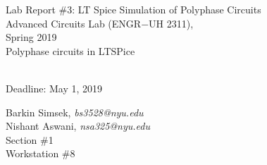 \documentclass[journal]{IEEEtran}
\begin{document}
\begin{titlepage}
    {\centering
        \vspace*{20em}
        {
        \huge 
        \begin{spacing}{1.5}
            Lab Report \#3: LT Spice Simulation of Polyphase Circuits 
            \\
            Advanced Circuits Lab (ENGR$-$UH 2311),\\
            Spring 2019
            \bigskip
            \Large
            \\
            Polyphase circuits in LTSPice
  
            \\
            \bigskip
            Deadline: May 1, 2019 
        \end{spacing}

        }
        
    }
    \vfill
    
    {
    \large
    
    \begin{spacing}{1.5}
    \noindent Barkin Simsek, {\it {bs3528@nyu.edu}} 
    \\
    Nishant Aswani, {\it {nsa325@nyu.edu}}
    \\
    Section \#1%
    \\
    Workstation \#8%
    \end{spacing}
    }


\end{titlepage}
{}
\setcounter{page}{1}




%
{}


\begin{abstract}
In this lab, the purpose was using the LTSpice software to simulate a wye-wye circuit and measure different properties such as voltages, currents, instantaneous power dissipated, and the average power dissipated at different points of the circuit. 

\end{abstract}
\end{document}
